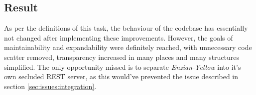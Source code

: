 \subsection{Result}
\label{sec:impr:enzian:result}

As per the definitions of this task, the behaviour of the codebase has essentially not changed after implementing these improvements. However, the goals of maintainability and expandability were definitely reached, with unnecessary code scatter removed, transparency increased in many places and many structures simplified. \newline
The only opportunity missed is to separate \emph{Enzian-Yellow} into it's own secluded REST server, as this would've prevented the issue described in section \ref{sec:issues:integration}.